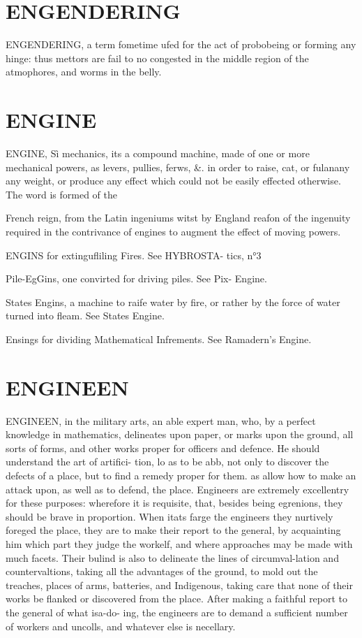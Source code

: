 \documentclass{article}
\begin{document}
\section*{ENGENDERING}
ENGENDERING, a term fometime ufed for the act of probobeing or forming any hinge: thus mettors are fail to no congested in the middle region of the atmophores, and worms in the belly.

\section*{ENGINE}
ENGINE, Sì mechanics, its a compound machine, made of one or more mechanical powers, as levers, pullies, ferws, \&. in order to raise, cat, or fulanany any weight, or produce any effect which could not be easily effected otherwise. The word is formed of the

French reign, from the Latin ingeniums witst by England reafon of the ingenuity required in the contrivance of engines to augment the effect of moving powers.

ENGINS for extingufliling Fires. See HYBROSTA- tics, n°3

Pile-EgGins, one convirted for driving piles. See Pix- Engine.

States Engins, a machine to raife water by fire, or rather by the force of water turned into fleam. See States Engine.

Ensings for dividing Mathematical Infrements. See Ramadern’s Engine.

\section*{ENGINEEN}
ENGINEEN, in the military arts, an able expert man, who, by a perfect knowledge in mathematics, delineates upon paper, or marks upon the ground, all sorts of forms, and other works proper for officers and defence. He should understand the art of artifici- tion, lo as to be abb, not only to discover the defects of a place, but to find a remedy proper for them. as allow how to make an attack upon, as well as to defend, the place. Engineers are extremely excellentry for these purposes: wherefore it is requisite, that, besides being egrenions, they should be brave in proportion. When itats farge the engineers they nurtively foreged the place, they are to make their report to the general, by acquainting him which part they judge the workelf, and where approaches may be made with much facets. Their bulind is also to delineate the lines of circumval-lation and countervaltions, taking all the advantages of the ground, to mold out the treaches, places of arms, batteries, and Indigenous, taking care that none of their works be flanked or discovered from the place. After making a faithful report to the general of what isa-do- ing, the engineers are to demand a sufficient number of workers and uncolls, and whatever else is necellary.
\end{document}
